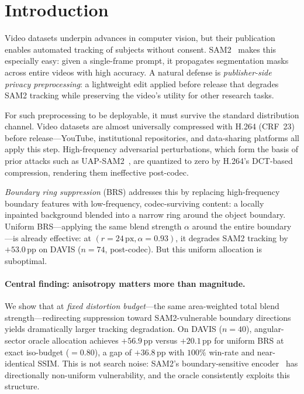 \section{Introduction}
\label{sec:intro}

Video datasets underpin advances in computer vision, but their publication enables automated tracking of subjects without consent.
SAM2~\citep{ravi2024sam2} makes this especially easy: given a single-frame prompt, it propagates segmentation masks across entire videos with high accuracy.
A natural defense is \emph{publisher-side privacy preprocessing}: a lightweight edit applied before release that degrades SAM2 tracking while preserving the video's utility for other research tasks.

For such preprocessing to be deployable, it must survive the standard distribution channel.
Video datasets are almost universally compressed with H.264 (CRF~23) before release---YouTube, institutional repositories, and data-sharing platforms all apply this step.
High-frequency adversarial perturbations, which form the basis of prior attacks such as UAP-SAM2~\citep{uap_sam2_2025}, are quantized to zero by H.264's DCT-based compression, rendering them ineffective post-codec.

\emph{Boundary ring suppression} (BRS) addresses this by replacing high-frequency boundary features with low-frequency, codec-surviving content: a locally inpainted background blended into a narrow ring around the object boundary.
Uniform BRS---applying the same blend strength $\alpha$ around the entire boundary---is already effective: at $(r{=}24\,\mathrm{px}, \alpha{=}0.93)$, it degrades SAM2 tracking by $+53.0\,\mathrm{pp}$ on DAVIS ($n{=}74$, post-codec).
But this uniform allocation is suboptimal.

\paragraph{Central finding: anisotropy matters more than magnitude.}
We show that at \emph{fixed distortion budget}---the same area-weighted total blend strength---redirecting suppression toward SAM2-vulnerable boundary directions yields dramatically larger tracking degradation.
On DAVIS ($n{=}40$), angular-sector oracle allocation achieves $+56.9\,\mathrm{pp}$ versus $+20.1\,\mathrm{pp}$ for uniform BRS at exact iso-budget ($=0.80$), a gap of $+36.8\,\mathrm{pp}$ with $100\%$ win-rate and near-identical SSIM.
This is not search noise: SAM2's boundary-sensitive encoder~\citep{ravi2024sam2} has directionally non-uniform vulnerability, and the oracle consistently exploits this structure.

